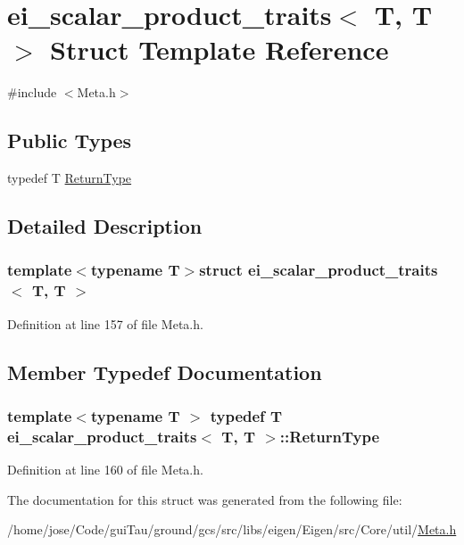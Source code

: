 \hypertarget{structei__scalar__product__traits_3_01_t_00_01_t_01_4}{\section{ei\-\_\-scalar\-\_\-product\-\_\-traits$<$ T, T $>$ Struct Template Reference}
\label{structei__scalar__product__traits_3_01_t_00_01_t_01_4}
}


{\ttfamily \#include $<$Meta.\-h$>$}

\subsection*{Public Types}
\begin{DoxyCompactItemize}
\item 
typedef T \hyperlink{structei__scalar__product__traits_3_01_t_00_01_t_01_4_ac3e4f69f57875ba46aa0f921d5a978c7}{Return\-Type}
\end{DoxyCompactItemize}


\subsection{Detailed Description}
\subsubsection*{template$<$typename T$>$struct ei\-\_\-scalar\-\_\-product\-\_\-traits$<$ T, T $>$}



Definition at line 157 of file Meta.\-h.



\subsection{Member Typedef Documentation}
\hypertarget{structei__scalar__product__traits_3_01_t_00_01_t_01_4_ac3e4f69f57875ba46aa0f921d5a978c7}{
\subsubsection[{Return\-Type}]{\setlength{\rightskip}{0pt plus 5cm}template$<$typename T $>$ typedef T {\bf ei\-\_\-scalar\-\_\-product\-\_\-traits}$<$ T, T $>$\-::{\bf Return\-Type}}}\label{structei__scalar__product__traits_3_01_t_00_01_t_01_4_ac3e4f69f57875ba46aa0f921d5a978c7}


Definition at line 160 of file Meta.\-h.



The documentation for this struct was generated from the following file\-:\begin{DoxyCompactItemize}
\item 
/home/jose/\-Code/gui\-Tau/ground/gcs/src/libs/eigen/\-Eigen/src/\-Core/util/\hyperlink{_meta_8h}{Meta.\-h}\end{DoxyCompactItemize}
